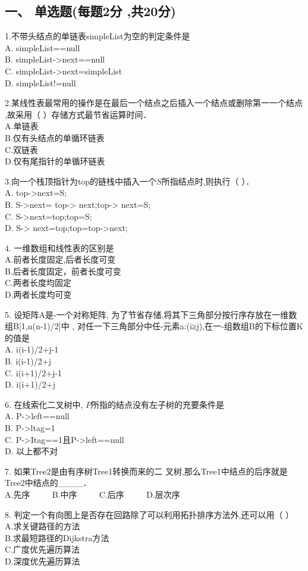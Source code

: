 
\subsection{一、 单选题(每题2分 ,共20分)}

1.不带头结点的单链表simpleList为空的判定条件是 \\
A. simpleList==null \\
B. simpleList->next==null \\
C. simpleList->next=simpleList \\
D. simpleList!=null

2.某线性表最常用的操作是在最后一个结点之后插入一个结点或删除第一一个结点 ,故采用（  ）存储方式最节省运算时间． \\
A.单链表 \\
B.仅有头结点的单循环链表 \\
C.双链表 \\
D.仅有尾指针的单循环链表

3.向一个栈顶指针为top的链栈中插入一个$S$所指结点时,则执行（    ）． \\
A. top->next=S; \\
B. S->next= top-> next;top-> next=S; \\
C. S->next=top;top=S; \\
D. S-> next=top;top=top->next;

4. 一维数组和线性表的区别是 \\
A.前者长度固定,后者长度可变 \\
B.后者长度固定，前者长度可变 \\
C.两者长度均固定 \\
D.两者长度均可变

5. 设矩阵A是-一个对称矩阵, 为了节省存储,将其下三角部分按行序存放在一维数组B[1,n(n-1)/2]中 , 对任一下三角部分中任-元素a:(i≥j),在一-组数组B的下标位置K的值是 \\
A. i(i-1)/2+j-1 \\
B. i(i-1)/2+j \\
C. i(i+1)/2+j-1 \\
D. i(i+1)/2+j

6. 在线索化二叉树中, $P$所指的结点没有左子树的充要条件是 \\
A. P->left==null \\
B. P->ltag=1 \\
C. P->Itag==1且P->left==null \\
D. 以上都不对

7. 如果Tree2是由有序树Tree1转换而来的二 叉树,那么Tree1中结点的后序就是Tree2中结点的____． \\
A.先序 $\qquad$ B.中序 $\qquad$ C.后序 $\qquad$ D.层次序

8. 判定一个有向图上是否存在回路除了可以利用拓扑排序方法外,还可以用（    ）  \\
A.求关键路径的方法 \\
B.求最短路径的Dijkstra方法 \\
C.广度优先遍历算法 \\
D.深度优先遍历算法

